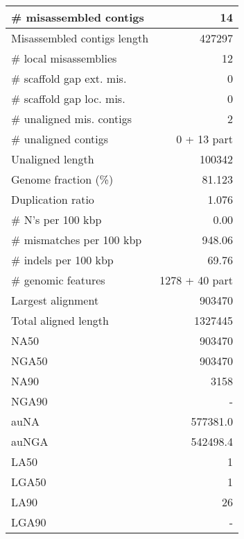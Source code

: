 \documentclass[12pt,a4paper]{article}
\begin{document}
\begin{table}[ht]
\begin{center}
\begin{tabular}{|l*{1}{|r}|}
\# misassembled contigs & 14 \\ \hline
Misassembled contigs length & 427297 \\ \hline
\# local misassemblies & 12 \\ \hline
\# scaffold gap ext. mis. & 0 \\ \hline
\# scaffold gap loc. mis. & 0 \\ \hline
\# unaligned mis. contigs & 2 \\ \hline
\# unaligned contigs & 0 + 13 part \\ \hline
Unaligned length & 100342 \\ \hline
Genome fraction (\%) & 81.123 \\ \hline
Duplication ratio & 1.076 \\ \hline
\# N's per 100 kbp & 0.00 \\ \hline
\# mismatches per 100 kbp & 948.06 \\ \hline
\# indels per 100 kbp & 69.76 \\ \hline
\# genomic features & 1278 + 40 part \\ \hline
Largest alignment & 903470 \\ \hline
Total aligned length & 1327445 \\ \hline
NA50 & 903470 \\ \hline
NGA50 & 903470 \\ \hline
NA90 & 3158 \\ \hline
NGA90 & - \\ \hline
auNA & 577381.0 \\ \hline
auNGA & 542498.4 \\ \hline
LA50 & 1 \\ \hline
LGA50 & 1 \\ \hline
LA90 & 26 \\ \hline
LGA90 & - \\ \hline
\end{tabular}
\end{center}
\end{table}
\end{document}
